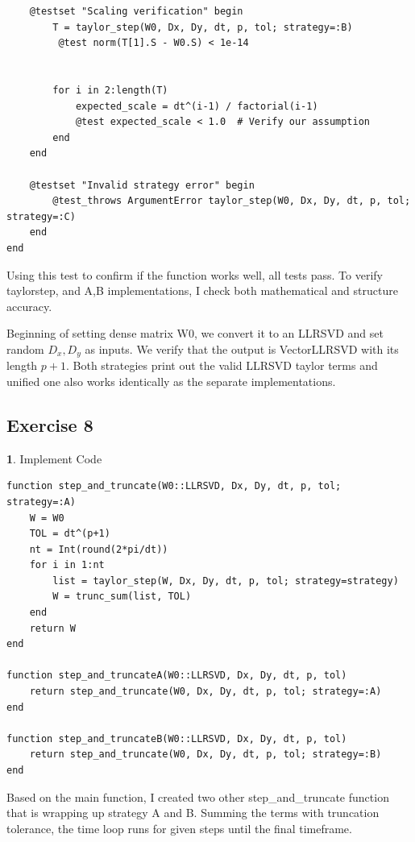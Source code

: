 \documentclass[11pt]{article}
\begin{document}
\begin{lstlisting}
    @testset "Scaling verification" begin
        T = taylor_step(W0, Dx, Dy, dt, p, tol; strategy=:B)
         @test norm(T[1].S - W0.S) < 1e-14
        
        
        for i in 2:length(T)
            expected_scale = dt^(i-1) / factorial(i-1)
            @test expected_scale < 1.0  # Verify our assumption
        end
    end

    @testset "Invalid strategy error" begin
        @test_throws ArgumentError taylor_step(W0, Dx, Dy, dt, p, tol; strategy=:C)
    end
end

\end{lstlisting}

Using this test to confirm if the function works well, all tests pass. To verify taylor\-step, and A,B implementations, I check both mathematical and structure accuracy. 

\vspace{0.6em}

Beginning of setting dense matrix W0, we convert it to an LLRSVD and set random $D_x, D_y$ as inputs. We verify that the output is Vector{LLRSVD} with its length $p+1$. Both strategies print out the valid LLRSVD taylor terms and unified one also works identically as the separate implementations. 

\subsection*{Exercise 8}

\textbf{1}. Implement Code

\begin{lstlisting}
function step_and_truncate(W0::LLRSVD, Dx, Dy, dt, p, tol; strategy=:A)
    W = W0
    TOL = dt^(p+1)
    nt = Int(round(2*pi/dt))
    for i in 1:nt
        list = taylor_step(W, Dx, Dy, dt, p, tol; strategy=strategy)
        W = trunc_sum(list, TOL)
    end
    return W
end

function step_and_truncateA(W0::LLRSVD, Dx, Dy, dt, p, tol)
    return step_and_truncate(W0, Dx, Dy, dt, p, tol; strategy=:A)
end

function step_and_truncateB(W0::LLRSVD, Dx, Dy, dt, p, tol)
    return step_and_truncate(W0, Dx, Dy, dt, p, tol; strategy=:B)
end
\end{lstlisting}

Based on the main function, I created two other step\_and\_truncate function that is wrapping up strategy A and B. Summing the terms with truncation tolerance, the time loop runs for given steps until the final timeframe.
\end{document}

